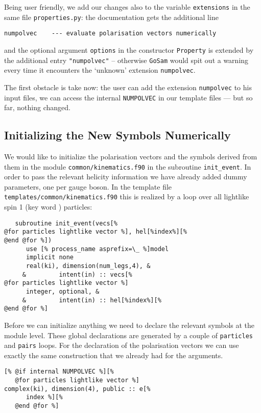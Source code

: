 \documentclass[11pt,a4paper]{refrep}
\newcommand{\golem}{{\tt GoSam}\xspace}
\begin{document}
Being user friendly, we add our changes also to the variable
\texttt{extensions} in the same file \texttt{properties.py}:
the documentation gets the additional line
\begin{verbatim}
numpolvec    --- evaluate polarisation vectors numerically
\end{verbatim}
and the optional argument \texttt{options} in the constructor
\texttt{Property} is extended by the additional entry
\texttt{"numpolvec"} -- otherwise \golem{} would spit out a warning
every time it encounters the `unknown' extension \texttt{numpolvec}.

The first obstacle is take now: the user can add the extension
\texttt{numpolvec} to his input files, we can access the internal
\texttt{NUMPOLVEC} in our template files --- but so far, nothing changed.

\subsection{Initializing the New Symbols Numerically}
We would like to initialize the polarisation vectors and the
symbols derived from them in the module
\texttt{common/\hspace{0pt}kinematics.f90} in the subroutine
\texttt{init\_event}. In order to pass the relevant helicity information
we have already added dummy parameters, one per gauge boson.
In the template file
\texttt{templates/\hspace{0pt}common/\hspace{0pt}kinematics.f90}
this is realized by a loop over all lightlike spin 1 (key word
) particles:
\begin{lstlisting}
   subroutine init_event(vecs[%
@for particles lightlike vector %], hel[%index%][%
@end @for %])
      use [% process_name asprefix=\_ %]model
      implicit none
      real(ki), dimension(num_legs,4), &
     &         intent(in) :: vecs[%
@for particles lightlike vector %]
      integer, optional, &
     &         intent(in) :: hel[%index%][%
@end @for %]
\end{lstlisting}

Before we can initialize anything we need to declare the relevant
symbols at the module level. These global declarations are generated
by a couple of \texttt{particles} and \texttt{pairs} loops.
For the declaration of the polarisation vectors we can use exactly
the same construction that we already had for the arguments.
\begin{lstlisting}
[% @if internal NUMPOLVEC %][%
   @for particles lightlike vector %]
complex(ki), dimension(4), public :: e[%
      index %][%
   @end @for %]
\end{lstlisting}
\end{document}
